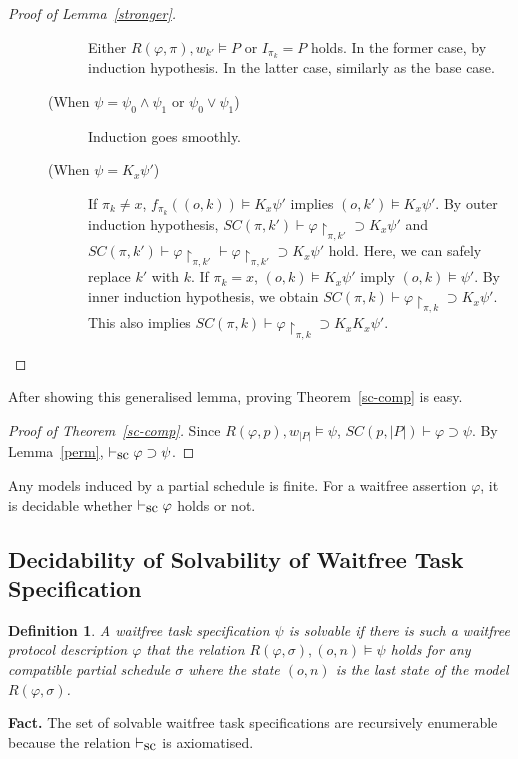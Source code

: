 \documentclass[doctor]{iscs-thesis}
\newcommand{\vdashsc}{\vdash_{\mbox{\rm sc}}}
\newtheorem{definition}{Definition}
\begin{document}
\begin{proof}[Proof of Lemma~\ref{stronger}]
\begin{description}
\begin{description}
 Either $R(\varphi, \pi), w_{k'}\models P$ or $I_{\pi_k}=P$ holds.
 In the former case, by induction hypothesis.
 In the latter case, similarly as the base case.
 \item[(When $\psi = \psi_0\wedge \psi_1$ or $\psi_0\vee\psi_1$)] 
 Induction goes smoothly.
 \item[(When $\psi = K_x\psi'$)] 
If $\pi_k\neq x$, $f_{\pi_k}((o,k))\models K_x\psi'$ implies $(o,k')\models K_x\psi'$.
	    By outer induction hypothesis, $SC(\pi,k')\vdash
	    \varphi\restriction_{\pi,k'}\supset K_x\psi'$ and
	    $SC(\pi,k')\vdash \varphi\restriction_{\pi,k'}\vdash
	    \varphi\restriction_{\pi,k'}\supset K_x\psi'$ hold.
	    Here, we can safely replace $k'$ with $k$.
	    If $\pi_k=x$, $(o,k)\models K_x\psi'$ imply
	    $(o,k)\models \psi'$.
	    By inner induction hypothesis, we obtain
	    $SC(\pi,k)\vdash\varphi\restriction_{\pi,k}\supset K_x\psi'$.
	    This also implies $SC(\pi,k)\vdash\varphi\restriction_{\pi,k}\supset K_xK_x\psi'$.
\end{description}
\end{description}
\end{proof}
After showing this generalised lemma, proving Theorem~\ref{sc-comp} is
easy.
\begin{proof}[Proof of Theorem~\ref{sc-comp}]
 Since $R(\varphi, p), w_{|P|}\models \psi$, $SC(p,|P|)\vdash \varphi\supset
 \psi$.
By Lemma~\ref{perm}, $\vdashsc
 \varphi\supset \psi$.
\end{proof}
Any models induced by a partial schedule is finite.  For a waitfree assertion $\varphi$,
it is decidable whether $\vdashsc \varphi$ holds or not.


\subsection{Decidability of Solvability of Waitfree Task Specification}

\begin{definition}
 A waitfree task specification $\psi$ is solvable if there is such a
 waitfree protocol description $\varphi$ that the relation
 $R(\varphi,\sigma), (o,n)\models\psi$ holds for any compatible partial
 schedule $\sigma$ where the state $(o,n)$ is the last state of the
 model $R(\varphi,\sigma)$.
\end{definition}

\noindent \textbf{Fact.} The set of solvable waitfree task specifications are
recursively enumerable because the relation $\vdashsc$ is axiomatised.
\end{document}
